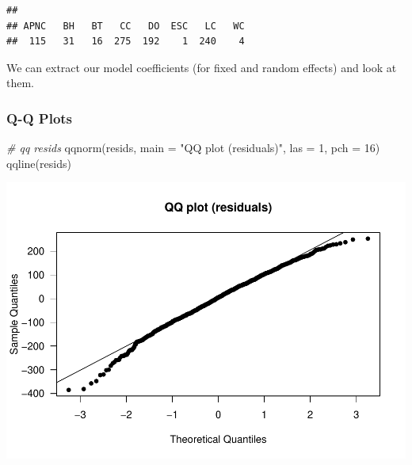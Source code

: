 \documentclass[
]{article}
\newenvironment{Shaded}{\begin{snugshade}}{\end{snugshade}}
\newcommand{\AttributeTok}[1]{\textcolor[rgb]{0.77,0.63,0.00}{#1}}
\newcommand{\CommentTok}[1]{\textcolor[rgb]{0.56,0.35,0.01}{\textit{#1}}}
\newcommand{\DecValTok}[1]{\textcolor[rgb]{0.00,0.00,0.81}{#1}}
\newcommand{\DocumentationTok}[1]{\textcolor[rgb]{0.56,0.35,0.01}{\textbf{\textit{#1}}}}
\newcommand{\FunctionTok}[1]{\textcolor[rgb]{0.00,0.00,0.00}{#1}}
\newcommand{\NormalTok}[1]{#1}
\newcommand{\OtherTok}[1]{\textcolor[rgb]{0.56,0.35,0.01}{#1}}
\newcommand{\SpecialCharTok}[1]{\textcolor[rgb]{0.00,0.00,0.00}{#1}}
\newcommand{\StringTok}[1]{\textcolor[rgb]{0.31,0.60,0.02}{#1}}
\begin{document}
\begin{Shaded}
\end{Shaded}

\begin{verbatim}
## 
## APNC   BH   BT   CC   DO  ESC   LC   WC 
##  115   31   16  275  192    1  240    4
\end{verbatim}

We can extract our model coefficients (for fixed and random effects) and
look at them.

\hypertarget{q-q-plots}{%
\subsubsection{Q-Q Plots}\label{q-q-plots}}

\begin{Shaded}
\begin{Highlighting}[]
\CommentTok{\# qq resids}
\FunctionTok{qqnorm}\NormalTok{(resids, }\AttributeTok{main =} \StringTok{"QQ plot (residuals)"}\NormalTok{, }\AttributeTok{las =} \DecValTok{1}\NormalTok{, }\AttributeTok{pch =} \DecValTok{16}\NormalTok{)}
\FunctionTok{qqline}\NormalTok{(resids)}
\end{Highlighting}
\end{Shaded}

\includegraphics{SCMU_egg_model_files/figure-latex/d4-1.pdf}
\end{document}
